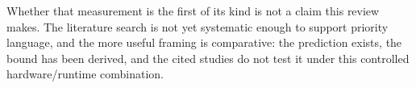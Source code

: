 Whether that measurement is the first of its kind is not a claim this
review makes.  The literature search is not yet systematic enough to
support priority language, and the more useful framing is comparative:
the prediction exists, the bound has been derived, and the cited studies
do not test it under this controlled hardware/runtime combination.
